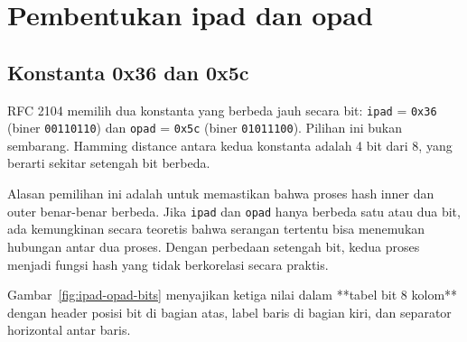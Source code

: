 \documentclass[11pt,a4paper]{article}
\begin{document}
\section{Pembentukan ipad dan opad}

\subsection{Konstanta 0x36 dan 0x5c}

RFC 2104 memilih dua konstanta yang berbeda jauh secara bit: \texttt{ipad} = \texttt{0x36} (biner \texttt{00110110}) dan \texttt{opad} = \texttt{0x5c} (biner \texttt{01011100}). Pilihan ini bukan sembarang. Hamming distance antara kedua konstanta adalah 4 bit dari 8, yang berarti sekitar setengah bit berbeda.

Alasan pemilihan ini adalah untuk memastikan bahwa proses hash inner dan outer benar-benar berbeda. Jika \texttt{ipad} dan \texttt{opad} hanya berbeda satu atau dua bit, ada kemungkinan secara teoretis bahwa serangan tertentu bisa menemukan hubungan antar dua proses. Dengan perbedaan setengah bit, kedua proses menjadi fungsi hash yang tidak berkorelasi secara praktis.

Gambar~\ref{fig:ipad-opad-bits} menyajikan ketiga nilai dalam **tabel bit 8 kolom** dengan header posisi bit di bagian atas, label baris di bagian kiri, dan separator horizontal antar baris.
\end{document}
